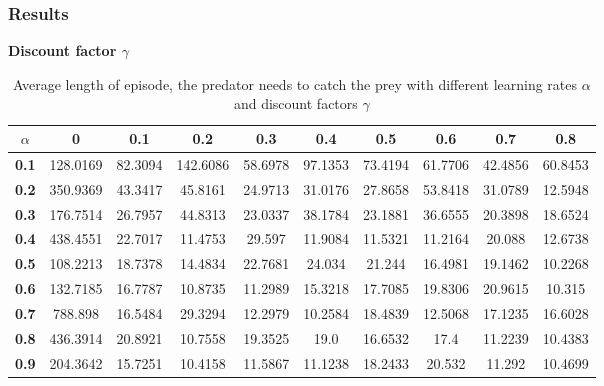 \documentclass[11pt]{article}
\begin{document}
\subsubsection{Results}

\begin{center}
\begin{table*}[ht]
{\small
\hfill{}
\begin{center}
\textbf{Discount factor $\gamma$}\\
\end{center}
\begin{tabular}{c|c|c|c|c|c|c|c|c|c}
\textbf{$\alpha$} & \textbf{0} & \textbf{0.1} & \textbf{0.2} & \textbf{0.3} & \textbf{0.4} & \textbf{0.5} & \textbf{0.6} & \textbf{0.7} & \textbf{0.8}\\
	\hline
\textbf{0.1} & 128.0169 & 82.3094 & 142.6086 & 58.6978 & 97.1353 & 73.4194 & 61.7706 & 42.4856 & 60.8453\\
\textbf{0.2} & 350.9369 & 43.3417 & 45.8161 & 24.9713 & 31.0176 & 27.8658 & 53.8418 & 31.0789 & 12.5948\\
\textbf{0.3} & 176.7514 & 26.7957 & 44.8313 & 23.0337 & 38.1784 & 23.1881 & 36.6555 & 20.3898 & 18.6524\\
\textbf{0.4} & 438.4551 & 22.7017 & 11.4753 & 29.597 & 11.9084 & 11.5321 & 11.2164 & 20.088 & 12.6738\\
\textbf{0.5} & 108.2213 & 18.7378 & 14.4834 & 22.7681 & 24.034 & 21.244 & 16.4981 & 19.1462 & 10.2268\\
\textbf{0.6} & 132.7185 & 16.7787 & 10.8735 & 11.2989 & 15.3218 & 17.7085 & 19.8306 & 20.9615 & 10.315\\
\textbf{0.7} & 788.898 & 16.5484 & 29.3294 & 12.2979 & 10.2584 & 18.4839 & 12.5068 & 17.1235 & 16.6028\\
\textbf{0.8} & 436.3914 & 20.8921 & 10.7558 & 19.3525 & 19.0 & 16.6532 & 17.4 & 11.2239 & 10.4383\\
\textbf{0.9} & 204.3642 & 15.7251 & 10.4158 & 11.5867 & 11.1238 & 18.2433 & 20.532 & 11.292 & 10.4699\\
\end{tabular}}
\hfill{}
\caption{Average length of episode, the predator needs to catch the prey with different learning rates $\alpha$ and discount factors $\gamma$}
\label{table:task1}
\end{table*}
\end{center}
\end{document}
